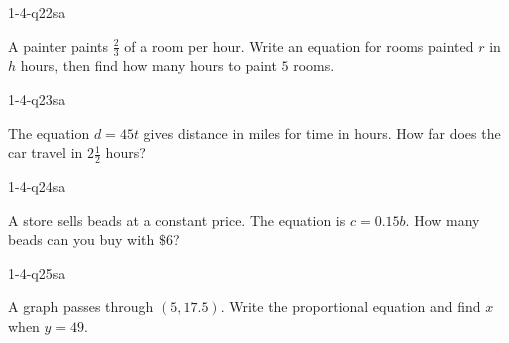 \begin{practiceQuestion}{1-4-q22}{sa}
\begin{questionText}
A painter paints $\frac{2}{3}$ of a room per hour. Write an equation for rooms painted $r$ in $h$ hours, then find how many hours to paint $5$ rooms.
\end{questionText}
\end{practiceQuestion}

\begin{practiceQuestion}{1-4-q23}{sa}
\begin{questionText}
The equation $d = 45t$ gives distance in miles for time in hours. How far does the car travel in $2\frac{1}{2}$ hours?
\end{questionText}
\end{practiceQuestion}

\begin{practiceQuestion}{1-4-q24}{sa}
\begin{questionText}
A store sells beads at a constant price. The equation is $c = 0.15b$. How many beads can you buy with $\$6$?
\end{questionText}
\end{practiceQuestion}

\begin{practiceQuestion}{1-4-q25}{sa}
\begin{questionText}
A graph passes through $(5, 17.5)$. Write the proportional equation and find $x$ when $y = 49$.
\end{questionText}
\end{practiceQuestion}


